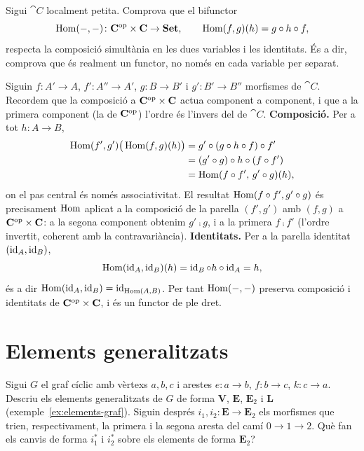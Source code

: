 \begin{exercici}\label{pr-bihom}
Sigui $\cat{C}$ localment petita. Comprova que el bifunctor
\[
\operatorname{Hom}(-,-)\colon\mathbf{C}^{\mathrm{op}}\times\mathbf{C}\to\mathbf{Set},\qquad \operatorname{Hom}(f,g)(h)=g\circ h\circ f,
\]
respecta la composició simultània en les dues variables i les identitats. És a dir, comprova que és realment un functor, no només en cada variable per separat.
\end{exercici}

\begin{solucio}
Siguin $f\colon A'\to A$, $f'\colon A''\to A'$, $g\colon B\to B'$ i $g'\colon B'\to B''$ morfismes de $\cat{C}$. Recordem que la composició a $\mathbf{C}^{\mathrm{op}}\times\mathbf{C}$ actua component a component, i que a la primera component (la de $\mathbf{C}^{\mathrm{op}}$) l'ordre és l'invers del de $\cat{C}$. \textbf{Composició.} Per a tot $h\colon A\to B$,
\[
\begin{aligned}
\operatorname{Hom}(f',g')\big(\operatorname{Hom}(f,g)(h)\big)
&=g'\circ(g\circ h\circ f)\circ f'\\
&=(g'\circ g)\circ h\circ(f\circ f')\\
&=\operatorname{Hom}(f\circ f',\,g'\circ g)(h),
\end{aligned}
\]
on el pas central és només associativitat. El resultat $\operatorname{Hom}(f\circ f',g'\circ g)$ és precisament $\operatorname{Hom}$ aplicat a la composició de la parella $(f',g')$ amb $(f,g)$ a $\mathbf{C}^{\mathrm{op}}\times\mathbf{C}$: a la segona component obtenim $g'\comp g$, i a la primera $f\comp f'$ (l'ordre invertit, coherent amb la contravariància). \textbf{Identitats.} Per a la parella identitat $(\operatorname{id}_A,\operatorname{id}_B)$,
\[
\operatorname{Hom}(\operatorname{id}_A,\operatorname{id}_B)(h)=\operatorname{id}_B\circ h\circ\operatorname{id}_A=h,
\]
és a dir $\operatorname{Hom}(\operatorname{id}_A,\operatorname{id}_B)=\operatorname{id}_{\operatorname{Hom}(A,B)}$. Per tant $\operatorname{Hom}(-,-)$ preserva composició i identitats de $\mathbf{C}^{\mathrm{op}}\times\mathbf{C}$, i és un functor de ple dret.
\end{solucio}

\section{Elements generalitzats}

\begin{exercici}\label{pr-elements-cicle}
Sigui $G$ el graf cíclic amb vèrtexs $a,b,c$ i arestes $e\colon a\to b$, $f\colon b\to c$, $k\colon c\to a$. Descriu els elements generalitzats de $G$ de forma $\mathbf V$, $\mathbf E$, $\mathbf E_2$ i $\mathbf L$ (exemple~\ref{ex:elements-graf}). Siguin després $i_1,i_2\colon\mathbf E\to\mathbf E_2$ els morfismes que trien, respectivament, la primera i la segona aresta del camí $0\to1\to2$. Què fan els canvis de forma $i_1^*$ i $i_2^*$ sobre els elements de forma $\mathbf E_2$?
\end{exercici}

